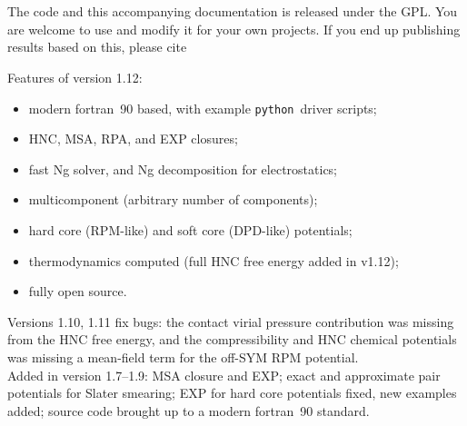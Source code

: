 \documentclass[12pt,a4paper]{article}
\newcommand{\FORTRAN}{{\sc fortran}}
\newcommand{\python}{{\tt python}}
\begin{document}
\\[6pt]
\\[6pt]

\noindent The code and this accompanying documentation is released
under the GPL.  You are welcome to use and modify it for your own
projects. If you end up publishing results based on this, please cite\\
%
\begin{center}
\end{center}

\vspace{0.25in}

\noindent Features of version 1.12:
\begin{itemize}
\item modern \FORTRAN\ 90 based, with example \python\ driver scripts;
\item HNC, MSA, RPA, and EXP closures;
\item fast Ng solver, and Ng decomposition for electrostatics;
\item multicomponent (arbitrary number of components);
\item hard core (RPM-like) and soft core (DPD-like) potentials;
\item thermodynamics computed (full HNC free energy added in v1.12);
\item fully open source.
\end{itemize}

\noindent
{\small Versions 1.10, 1.11 fix bugs: the
contact virial pressure contribution was missing from the HNC free
energy, and the compressibility and HNC chemical potentials was
missing a mean-field term for the off-SYM RPM potential.}\\

\noindent
{\small Added in version 1.7--1.9: MSA closure and EXP; exact and approximate
pair potentials for Slater smearing; EXP for hard core potentials
fixed, new examples added; source code brought up to a modern
\FORTRAN\ 90 standard.}

\newpage
{\small\tableofcontents}
\newpage
\end{document}
